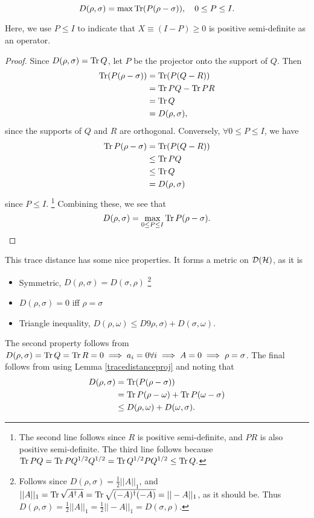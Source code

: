 \begin{lem}\label{tracedistanceproj}
\begin{equation}
    D(\rho,\sigma)=\max \operatorname{Tr}(P(\rho-\sigma)), \quad 0 \leq P \leq I.
\end{equation}
\end{lem}
Here, we use $P\leq I$ to indicate that $X\equiv (I-P)\geq 0 $ is positive semi-definite as an operator.
\begin{proof}
Since $D(\rho,\sigma)=\operatorname{Tr} Q$, let $P$ be the projector onto the support of $Q$. Then
\begin{align*}
    \operatorname{Tr}(P(\rho-\sigma))&=\operatorname{Tr}(P(Q-R))\\
        &=\operatorname{Tr} PQ - \operatorname{Tr} PR\\
        &= \operatorname{Tr} Q\\
        &= D(\rho,\sigma),
\end{align*}
since the supports of $Q$ and $R$ are orthogonal.
Conversely, $\forall 0\leq P \leq I$, we have
\begin{align*}
    \operatorname{Tr} P(\rho-\sigma) &= \operatorname{Tr}(P(Q-R))\\
        &\leq \operatorname{Tr} PQ\\
        &\leq \operatorname{Tr} Q\\
        &= D(\rho,\sigma)
\end{align*}
since $P\leq I$.%
    \footnote{The second line follows since $R$ is positive semi-definite, and $PR$ is also positive semi-definite. The third line follows because $\operatorname{Tr} PQ = \operatorname{Tr} P Q^{1/2} Q^{1/2}=\operatorname{Tr} Q^{1/2} P Q^{1/2} \leq \operatorname{Tr} Q.$}
Combining these, we see that
\begin{equation*}
    D(\rho,\sigma) = \max_{0\leq P \leq I} \operatorname{Tr} P(\rho-\sigma).
\end{equation*}
\end{proof}
This trace distance has some nice properties. It forms a metric on $\mathcal{D}(\mathcal H)$, as it is
\begin{itemize}
    \item Symmetric, $D(\rho,\sigma)=D(\sigma,\rho)$%
        \footnote{
            Follows since $D(\rho,\sigma)=\frac{1}{2}||A||_1$, and $||A||_1=\operatorname{Tr}\sqrt{A^\dagger A}=\operatorname{Tr}\sqrt{(-A)^\dagger (-A)}=||-A||_1$, as it should be. Thus $D(\rho,\sigma)=\frac{1}{2}||A||_1
            =\frac{1}{2}||-A||_1=D(\sigma,\rho).$
        }
    \item $D(\rho,\sigma)=0$ iff $\rho=\sigma$
    \item Triangle inequality, $D(\rho,\omega) \leq D9\rho,\sigma)+D(\sigma,\omega)$.
\end{itemize}
The second property follows from $D(\rho,\sigma)=\operatorname{Tr} Q =\operatorname{Tr} R=0\implies a_i=0\forall i \implies A=0 \implies \rho=\sigma$. The final follows from using Lemma \ref{tracedistanceproj} and noting that
\begin{align*}
    D(\rho,\sigma) &= \operatorname{Tr}(P(\rho-\sigma))\\
        &= \operatorname{Tr} P(\rho-\omega)+\operatorname{Tr} P(\omega-\sigma)\\
        &\leq D(\rho,\omega) +D(\omega,\sigma).
\end{align*}


